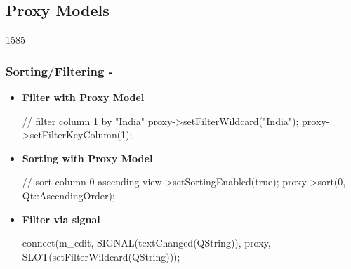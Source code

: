 %
%
%
%

\subsection{Proxy Models}
\begin{slide}[fragile]{1585}\frametitle{Sorting/Filtering - }
  \begin{itemize}
  \item \textbf{Filter with Proxy Model}
\begin{cpp}
// filter column 1 by "India"
proxy->setFilterWildcard("India");
proxy->setFilterKeyColumn(1); 
\end{cpp}
\item \textbf{Sorting with Proxy Model}
\begin{cpp}
// sort column 0 ascending
view->setSortingEnabled(true);
proxy->sort(0, Qt::AscendingOrder);
\end{cpp}
  \end{itemize}
\medskip
\begin{itemize}
\item \textbf{Filter via  signal}
\begin{cpp}
connect(m_edit, SIGNAL(textChanged(QString)), 
    proxy, SLOT(setFilterWildcard(QString)));      
\end{cpp}
\end{itemize}
\end{slide}

